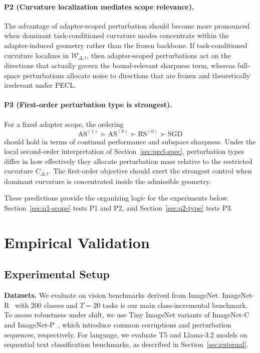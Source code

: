 \documentclass[10pt]{article} %
\begin{document}
\paragraph{P2 (Curvature localization mediates scope relevance).}
The advantage of adapter-scoped perturbation should become more pronounced when dominant task-conditioned curvature modes concentrate within the adapter-induced geometry rather than the frozen backbone.
If task-conditioned curvature localizes in $\mathcal{W}_{\Delta,t}$, then adapter-scoped perturbations act on the directions that actually govern the bound-relevant sharpness term, whereas full-space perturbations allocate noise to directions that are frozen and theoretically irrelevant under PECL.

\paragraph{P3 (First-order perturbation type is strongest).}
For a fixed adapter scope, the ordering
\[
\mathrm{AS}^{(1)} \succ \mathrm{AS}^{(0)} \succ \mathrm{RS}^{(0)} \succ \mathrm{SGD}
\]
should hold in terms of continual performance and subspace sharpness.
Under the local second-order interpretation of Section~\ref{sec:pecl-spec}, perturbation types differ in how effectively they allocate perturbation mass relative to the restricted curvature $C_{\Delta,t}$.
The first-order objective should exert the strongest control when dominant curvature is concentrated inside the admissible geometry.

These predictions provide the organizing logic for the experiments below.
Section~\ref{sec:q1-scope} tests P1 and P2, and Section~\ref{sec:q2-type} tests P3.

\section{Empirical Validation}
\label{sec:experiments}

\subsection{Experimental Setup}

\noindent\textbf{Datasets.}
We evaluate on vision benchmarks derived from ImageNet.
ImageNet-R~\citep{ImagenetR_Hendrycks_2021_ICCV} with 200 classes and $T=20$ tasks is our main class-incremental benchmark.
To assess robustness under shift, we use Tiny ImageNet variants of ImageNet-C and ImageNet-P~\citep{hendrycks2018benchmarking}, which introduce common corruptions and perturbation sequences, respectively.
For language, we evaluate T5 and Llama-3.2 models on sequential text classification benchmarks, as described in Section~\ref{sec:external}.
\end{document}
